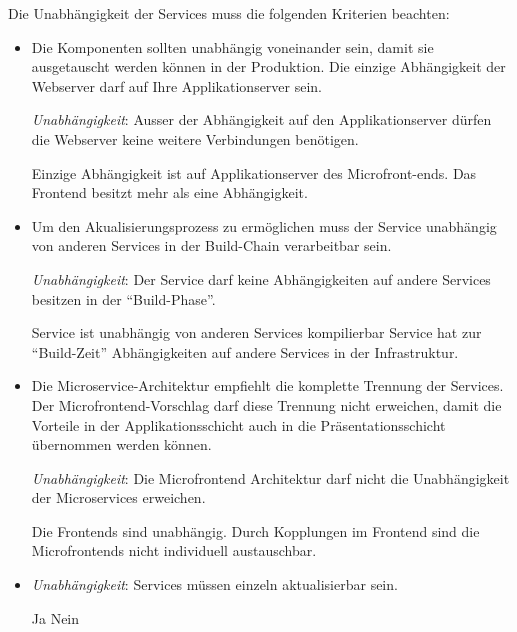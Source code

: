Die Unabhängigkeit der Services  muss die folgenden Kriterien beachten:
\begin{itemize}
    \item Die Komponenten sollten unabhängig voneinander sein, damit sie ausgetauscht werden können in der Produktion. Die einzige Abhängigkeit der Webserver darf auf Ihre Applikationserver sein.
    
    \textit{Unabhängigkeit}:  Ausser der Abhängigkeit auf den Applikationserver dürfen die Webserver keine weitere Verbindungen benötigen.
    
    \begin{itemize}
        \pro Einzige Abhängigkeit ist auf Applikationserver des Microfront-ends.
        \con Das Frontend besitzt mehr als eine Abhängigkeit. 
    \end{itemize}
    
    \item  Um den Akualisierungsprozess zu ermöglichen muss der Service unabhängig von anderen Services in der Build-Chain verarbeitbar sein.
    
    \textit{Unabhängigkeit}:  Der Service darf keine Abhängigkeiten auf andere Services besitzen in der \enquote{Build-Phase}.
    
    \begin{itemize}
        \pro Service ist unabhängig von anderen Services kompilierbar
        \con Service hat zur \enquote{Build-Zeit} Abhängigkeiten auf andere Services in der Infrastruktur.
    \end{itemize}
    
    \item Die Microservice-Architektur empfiehlt die komplette Trennung der Services. Der Microfrontend-Vorschlag darf diese Trennung nicht erweichen, damit die Vorteile in der Applikationsschicht auch in die Präsentationsschicht übernommen werden können.
    
    \textit{Unabhängigkeit}: Die Microfrontend Architektur darf nicht die Unabhängigkeit der Microservices erweichen.
    \begin{itemize}
        \pro Die Frontends sind unabhängig.
        \con Durch Kopplungen im Frontend sind die Microfrontends nicht individuell austauschbar.
    \end{itemize}
    
    \item \textit{Unabhängigkeit}: Services müssen einzeln aktualisierbar sein.
    \begin{itemize}
        \pro Ja
        \con Nein
    \end{itemize}
\end{itemize}

